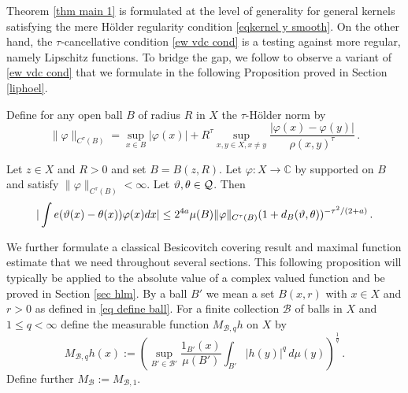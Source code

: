 Theorem \ref{thm main 1} is formulated at the level of generality
for general kernels satisfying the mere H\"older regularity condition \eqref{eqkernel y smooth}. On the other hand, the $\tau$-cancellative condition \eqref{ew vdc cond} is a testing against more regular,
namely Lipschitz functions. To bridge the gap, we follow \cite{zk-polynomial} to observe a variant of \eqref{ew vdc cond} that we formulate
in the following Proposition proved in Section \ref{liphoel}.


Define for any open ball $B$ of radius $R$ in $X$ the $\tau$-H\"older norm by
$$
    \|\varphi\|_{C^\tau(B)} = \sup_{x \in B} |\varphi(x)| + R^\tau \sup_{x,y \in X, x \neq y} \frac{|\varphi(x) - \varphi(y)|}{\rho(x,y)^\tau}\,.
$$
\begin{prop}
    \label{lem vdc regularity}
     Let $z\in X$ and $R>0$ and set $B=B(z,R)$.
     Let $\varphi: X \to \mathbb{C}$ by
     supported on $B$ and satisfy $\|{\varphi}\|_{C^\tau(B)}<\infty$.
     Let $\vartheta, \theta \in \mathcal{Q}$. Then
    \begin{equation}
        \label{eq vdc cond tau 2}
        |\int e(\vartheta(x)-{\theta(x)})\varphi(x) dx|\le
         2^{4a} \mu(B) \|{\varphi}\|_{C^\tau(B)}
       (1 + d_{B}(\vartheta,\theta))^{-\tau^2/(2+a)}
    \,.
    \end{equation}
    \end{prop}

We further formulate a classical Besicovitch covering result
and maximal function estimate that we need throughout several sections.
This following proposition will typically be applied to the absolute value of a complex valued function and be proved in Section \ref{sec hlm}. By a ball $B'$ we mean a set $B(x,r)$ with $x\in X$
and $r>0$ as defined in \eqref{eq define ball}.
For a finite collection $\mathcal{B}$ of balls in $X$
and $1\le q< \infty$  define the measurable function $M_{\mathcal{B},q}h$ on $X$ by
\begin{equation}\label{def hlm}
M_{\mathcal{B},q}h(x):=\left(\sup_{B'\in \mathcal{B'}} \frac{1_{B'}(x)}{\mu(B')}\int _{B'} |h(y)|^q\, d\mu(y)\right)^\frac 1q\,  .
\end{equation}
Define further $M_{\mathcal{B}}:=M_{\mathcal{B},1}$.

